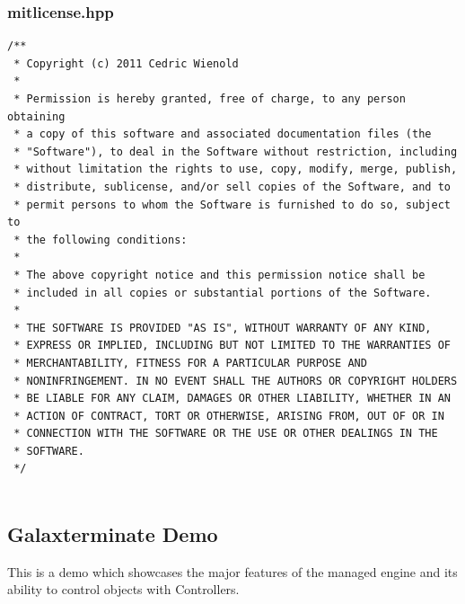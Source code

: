 \documentclass[12pt]{article}
\begin{document}
\subsubsection{mitlicense.hpp}
\begin{lstlisting}[breaklines]
/**
 * Copyright (c) 2011 Cedric Wienold
 * 
 * Permission is hereby granted, free of charge, to any person obtaining
 * a copy of this software and associated documentation files (the
 * "Software"), to deal in the Software without restriction, including
 * without limitation the rights to use, copy, modify, merge, publish,
 * distribute, sublicense, and/or sell copies of the Software, and to
 * permit persons to whom the Software is furnished to do so, subject to
 * the following conditions:
 *
 * The above copyright notice and this permission notice shall be
 * included in all copies or substantial portions of the Software.
 * 
 * THE SOFTWARE IS PROVIDED "AS IS", WITHOUT WARRANTY OF ANY KIND,
 * EXPRESS OR IMPLIED, INCLUDING BUT NOT LIMITED TO THE WARRANTIES OF
 * MERCHANTABILITY, FITNESS FOR A PARTICULAR PURPOSE AND
 * NONINFRINGEMENT. IN NO EVENT SHALL THE AUTHORS OR COPYRIGHT HOLDERS
 * BE LIABLE FOR ANY CLAIM, DAMAGES OR OTHER LIABILITY, WHETHER IN AN
 * ACTION OF CONTRACT, TORT OR OTHERWISE, ARISING FROM, OUT OF OR IN
 * CONNECTION WITH THE SOFTWARE OR THE USE OR OTHER DEALINGS IN THE
 * SOFTWARE.
 */
 
\end{lstlisting}

\subsection{Galaxterminate Demo}
This is a demo which showcases the major features of the managed engine and its ability to control objects with Controllers.
\end{document}
